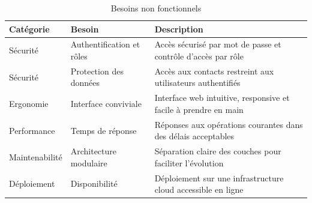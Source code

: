 \begin{table}[H]
\centering
\begin{tabularx}{\textwidth}{|l|l|X|}
\hline
\textbf{Catégorie} & \textbf{Besoin} & \textbf{Description} \\
\hline
Sécurité & Authentification et rôles & Accès sécurisé par mot de passe et contrôle d'accès par rôle \\
\hline
Sécurité & Protection des données & Accès aux contacts restreint aux utilisateurs authentifiés \\
\hline
Ergonomie & Interface conviviale & Interface web intuitive, responsive et facile à prendre en main \\
\hline
Performance & Temps de réponse & Réponses aux opérations courantes dans des délais acceptables \\
\hline
Maintenabilité & Architecture modulaire & Séparation claire des couches pour faciliter l'évolution \\
\hline
Déploiement & Disponibilité & Déploiement sur une infrastructure cloud accessible en ligne \\
\hline
\end{tabularx}
\caption{Besoins non fonctionnels}
\label{tab:bnf}
\end{table}

